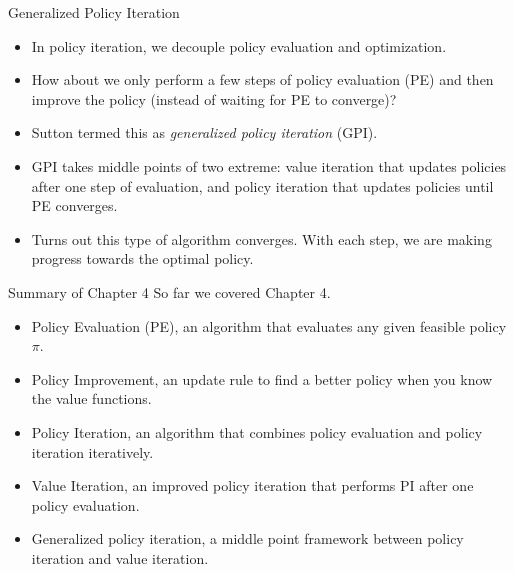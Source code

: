 \documentclass[handout]{beamer}
\begin{document}
\begin{frame}{Generalized Policy Iteration}
\begin{itemize}[<+(1)->]
	\item In policy iteration, we decouple policy evaluation and optimization.
	\item How about we only perform a few steps of policy evaluation (PE) and then improve the policy (instead of waiting for PE to converge)?
	\item Sutton termed this as \textit{generalized policy iteration} (GPI).
	\item GPI takes middle points of two extreme: value iteration that updates policies after one step of evaluation, and policy iteration that updates policies until PE converges.
	\item Turns out this type of algorithm converges. With each step, we are making progress towards the optimal policy.
\end{itemize}
\end{frame}

\begin{frame}{Summary of Chapter 4}
So far we covered Chapter 4.
\begin{itemize}[<+(1)->]
	\item Policy Evaluation (PE), an algorithm that evaluates any given feasible policy $\pi$.
	\item Policy Improvement, an update rule to find a better policy when you know the value functions.
	\item Policy Iteration, an algorithm that combines policy evaluation and policy iteration iteratively.
	\item Value Iteration, an improved policy iteration that performs PI after one policy evaluation.
	\item Generalized policy iteration, a middle point framework between policy iteration and value iteration.
\end{itemize}
\end{frame}
\end{document}
